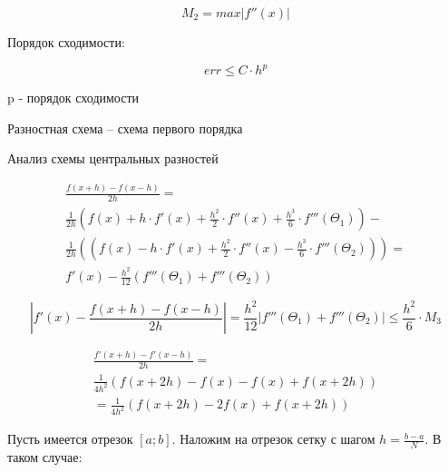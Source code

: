 \documentclass[10pt,a4paper]{article}
\begin{document}
\begin{enumerate}
			\begin{equation}
				M_{2} = max\left|f''\left(x\right)\right|
			\end{equation}
			
			Порядок сходимости:
			
			\begin{equation}
				err \leq C\cdot h^{p}
			\end{equation}
			
			p - порядок сходимости
			
			Разностная схема -- схема первого порядка
			
			Анализ схемы центральных разностей
			
			\begin{eqnarray}
				\frac{f\left(x + h\right) - f\left(x - h\right)}{2h} = \\
				\frac{1}{2h}\left(f\left(x\right) + h\cdot f'\left(x\right) + \frac{h^2}{2}\cdot f''\left(x\right) + \frac{h^3}{6}\cdot f'''\left(\Theta_{1}\right)\right) - \\
				\frac{1}{2h}\left(\left(f\left(x\right) - h\cdot f'\left(x\right) + \frac{h^2}{2}\cdot f''\left(x\right) - \frac{h^3}{6}\cdot f'''\left(\Theta_{2}\right) \right)\right) = \\
				f'\left(x\right) - \frac{h^2}{12}\left(f'''\left(\Theta_{1}\right) + f'''\left(\Theta_{2}\right)\right)
			\end{eqnarray}
			
			\begin{equation}
				\left|f'\left(x\right) - \frac{f\left(x + h\right) - f\left(x - h\right)}{2h}\right| = \frac{h^2}{12}\left|f'''\left(\Theta_{1}\right) + f'''\left(\Theta_{2}\right)\right| \leq \frac{h^2}{6}\cdot M_{3}
			\end{equation}
			
			\begin{eqnarray}
				\frac{f'\left(x + h\right) - f'\left(x - h\right)}{2h} = \\ 
				\frac{1}{4h^2}\left(f\left(x + 2h\right) - f\left(x\right) - f\left(x\right) + f\left(x + 2h\right)\right)\\
				 = \frac{1}{4h^2}\left(f\left(x + 2h\right) -  2f\left(x\right) + f\left(x + 2h\right)\right)
			\end{eqnarray}
			
		\end{enumerate}
		
		Пусть имеется отрезок $\left[a; b\right]$. Наложим на отрезок сетку с шагом $h = \frac{b - a}{N}$. В таком случае:
		
\end{document}

